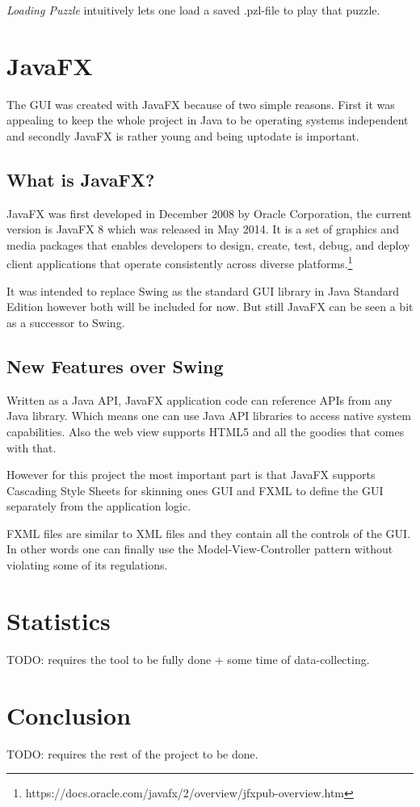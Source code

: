 \emph{Loading Puzzle} intuitively lets one load a saved .pzl-file to play that puzzle.

\section{JavaFX} \label{JavaFX}
The GUI was created with JavaFX because of two simple reasons. First it was appealing to keep the whole project in Java to be operating systems independent and secondly JavaFX is rather young and being uptodate is important.

\subsection{What is JavaFX?}
JavaFX was first developed in December 2008 by Oracle Corporation, the current version is JavaFX 8 which was released in May 2014. It is a set of graphics and media packages that enables developers to design, create, test, debug, and deploy client applications that operate consistently across diverse platforms.\footnote{https://docs.oracle.com/javafx/2/overview/jfxpub-overview.htm} 

It was intended to replace Swing as the standard GUI library in Java Standard Edition however both will be included for now. But still JavaFX can be seen a bit as a successor to Swing.

\subsection{New Features over Swing}
Written as a Java API, JavaFX application code can reference APIs from any Java library. Which means one can use Java API libraries to access native system capabilities. 
Also the web view supports HTML5 and all the goodies that comes with that.

However for this project the most important part is that JavaFX supports Cascading Style Sheets for skinning ones GUI and FXML to define the GUI separately from the application logic.

FXML files are similar to XML files and they contain all the controls of the GUI. In other words one can finally use the Model-View-Controller pattern without violating some of its regulations.

\section{Statistics} \label{Statistics}
TODO: requires the tool to be fully done + some time of data-collecting.

\section{Conclusion} \label{Conclusion}
TODO: requires the rest of the project to be done.